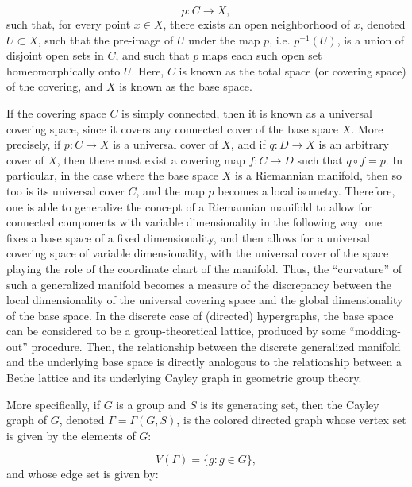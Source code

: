 \documentclass{article}
\begin{document}
\begin{equation}
p : C \to X,
\end{equation}
such that, for every point ${x \in X}$, there exists an open neighborhood of $x$, denoted ${U \subset X}$, such that the pre-image of $U$ under the map $p$, i.e. ${p^{-1} \left( U \right)}$, is a union of disjoint open sets in $C$, and such that $p$ maps each such open set homeomorphically onto $U$. Here, $C$ is known as the total space (or covering space) of the covering, and $X$ is known as the base space.

If the covering space $C$ is simply connected, then it is known as a universal covering space, since it covers any connected cover of the base space $X$\cite{munkres}. More precisely, if ${p : C \to X}$ is a universal cover of $X$, and if ${q : D \to X}$ is an arbitrary cover of $X$, then there must exist a covering map ${f : C \to D}$ such that ${q \circ f = p}$. In particular, in the case where the base space $X$ is a Riemannian manifold, then so too is its universal cover $C$, and the map $p$ becomes a local isometry. Therefore, one is able to generalize the concept of a Riemannian manifold to allow for connected components with variable dimensionality in the following way: one fixes a base space of a fixed dimensionality, and then allows for a universal covering space of variable dimensionality, with the universal cover of the space playing the role of the coordinate chart of the manifold. Thus, the ``curvature'' of such a generalized manifold becomes a measure of the discrepancy between the local dimensionality of the universal covering space and the global dimensionality of the base space. In the discrete case of (directed) hypergraphs, the base space can be considered to be a group-theoretical lattice, produced by some ``modding-out'' procedure. Then, the relationship between the discrete generalized manifold and the underlying base space is directly analogous to the relationship between a Bethe lattice\cite{bethe}\cite{baxter} and its underlying Cayley graph\cite{ostilli} in geometric group theory.

More specifically, if $G$ is a group and $S$ is its generating set, then the Cayley graph of $G$, denoted ${\Gamma = \Gamma \left( G, S \right)}$, is the colored directed graph whose vertex set is given by the elements of $G$\cite{cayley}\cite{magnus}:

\begin{equation}
V \left( \Gamma \right) = \lbrace g : g \in G \rbrace,
\end{equation}
and whose edge set is given by:
\end{document}
